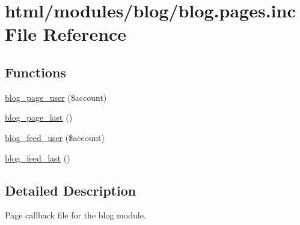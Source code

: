 \hypertarget{blog_8pages_8inc}{
\section{html/modules/blog/blog.pages.inc File Reference}
\label{blog_8pages_8inc}
}
\subsection*{Functions}
\begin{DoxyCompactItemize}
\item 
\hyperlink{blog_8pages_8inc_a87fd5ef697f7fc4cccaf2c54933cc29a}{blog\_\-page\_\-user} (\$account)
\item 
\hyperlink{blog_8pages_8inc_a6720685209529757688eed74112994e4}{blog\_\-page\_\-last} ()
\item 
\hyperlink{blog_8pages_8inc_ad543fb1fb96c40cb48615bc78dfa18e9}{blog\_\-feed\_\-user} (\$account)
\item 
\hyperlink{blog_8pages_8inc_a4b08fa8027c0eaf79656992095ee33e5}{blog\_\-feed\_\-last} ()
\end{DoxyCompactItemize}


\subsection{Detailed Description}
Page callback file for the blog module. 

